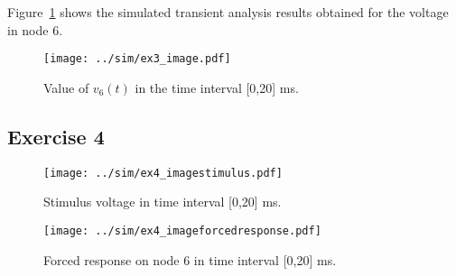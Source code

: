 Figure~\ref{fig:Ex3_Image} shows the simulated transient analysis results obtained for the voltage in node 6.

\begin{figure}[H]
  \centering
  \texttt{[image: ../sim/ex3\_image.pdf]}
  \caption{Value of $v_6(t)$ in the time interval [0,20] ms.}
  \label{fig:Ex3_Image}
\end{figure}

\subsection{Exercise 4}

\begin{figure}[H]
  \centering
  \texttt{[image: ../sim/ex4\_imagestimulus.pdf]}
  \caption{Stimulus voltage in time interval [0,20] ms.}
  \label{fig:Ex4_Image_Stimulus}
\end{figure}


\begin{figure}[H]
  \centering
  \texttt{[image: ../sim/ex4\_imageforcedresponse.pdf]}
  \caption{Forced response on node 6 in time interval [0,20] ms.}
  \label{fig:Ex4_Image_ForcedResponse}
\end{figure}
